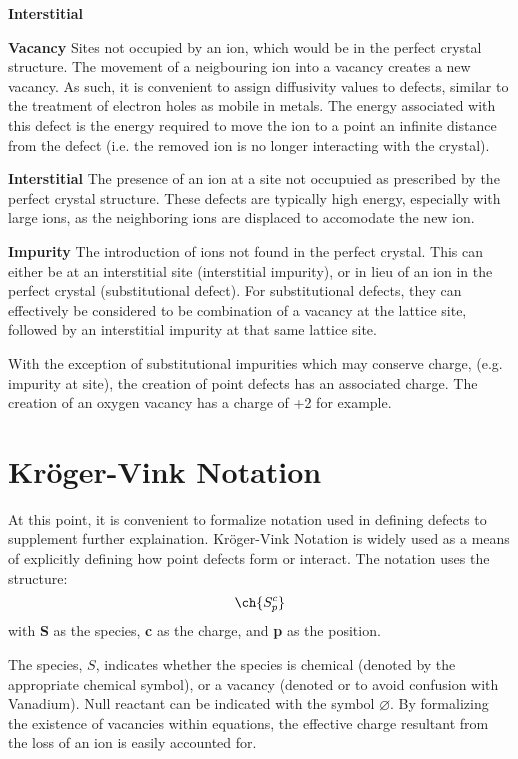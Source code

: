 \begin{labeling}{\textbf{Interstitial}}
\item[\textbf{Vacancy}] Sites not occupied by an ion, which would be in the perfect crystal structure. The movement of a neigbouring ion into a vacancy creates a new vacancy. As such, it is convenient to assign diffusivity values to defects, similar to the treatment of electron holes as mobile in metals. The energy associated with this defect is the energy required to move the ion to a point an infinite distance from the defect (i.e. the removed ion is no longer interacting with the crystal).

\item[\textbf{Interstitial}] The presence of an ion at a site not occupuied as prescribed by the perfect crystal structure. These defects are typically high energy, especially with large ions, as the neighboring ions are displaced to accomodate the new ion.
\item[\textbf{Impurity}] The introduction of ions not found in the perfect crystal. This can either be at an interstitial site (interstitial impurity), or in lieu of an ion in the perfect crystal (substitutional defect).
For substitutional defects, they can effectively be considered to be combination of a vacancy at the lattice site, followed by an interstitial impurity at that same lattice site.
\end{labeling}

With the exception of substitutional impurities which may conserve charge, (e.g.  impurity at  site), the creation of point defects has an associated charge. The creation of an oxygen vacancy has a charge of +2 for example.

\newpage
\section{Kr\"oger-Vink Notation}
At this point, it is convenient to formalize notation used in defining defects to supplement further explaination.
Kr\"oger-Vink Notation \citep{Kroger1958} is widely used as a means of explicitly defining how point defects form or interact.
The notation uses the structure: \begin{equation}
\ch{S^c_{p}}
\label{eq:kroger}
\end{equation} with \textbf{S} as the species, \textbf{c} as the charge, and \textbf{p} as the position.

The species, $S$, indicates whether the species is chemical (denoted by the appropriate chemical symbol), or a vacancy (denoted  or  to avoid confusion with Vanadium).
Null reactant can be indicated with the symbol $\varnothing$.
By formalizing the existence of vacancies within equations, the effective charge resultant from the loss of an ion is easily accounted for.

